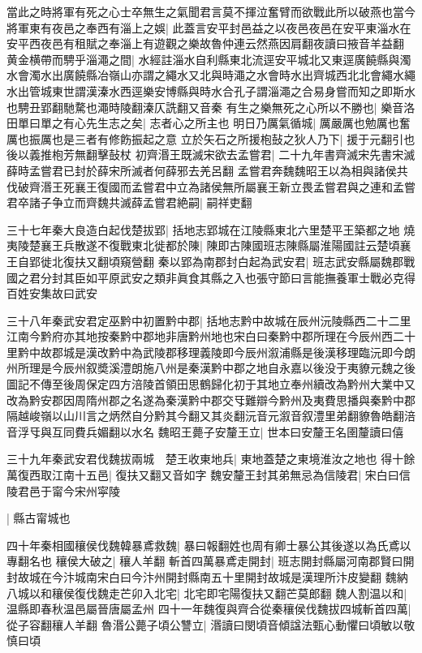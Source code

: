 當此之時將軍有死之心士卒無生之氣聞君言莫不揮泣奮臂而欲戰此所以破燕也當今將軍東有夜邑之奉西有淄上之娛|{
	此蓋言安平封邑益之以夜邑夜邑在安平東淄水在安平西夜邑有租賦之奉淄上有遊觀之樂故魯仲連云然燕因肩翻夜讀曰掖音羊益翻}
黄金横帶而騁乎淄澠之間|{
	水經註淄水自利縣東北流逕安平城北又東逕廣饒縣與濁水會濁水出廣饒縣冶嶺山亦謂之繩水又北與時澠之水會時水出齊城西北北會繩水繩水出管城東世謂漢溱水西逕樂安博縣與時水合孔子謂淄澠之合易身嘗而知之即斯水也騁丑郢翻馳騖也澠時陵翻溱仄詵翻又音秦}
有生之樂無死之心所以不勝也|{
	樂音洛}
田單曰單之有心先生志之矣|{
	志者心之所主也}
明日乃厲氣循城|{
	厲嚴厲也勉厲也奮厲也振厲也是三者有修飭振起之意}
立於矢石之所援枹鼔之狄人乃下|{
	援于元翻引也後以義推枹芳無翻擊鼔杖}
初齊湣王既滅宋欲去孟嘗君|{
	二十九年書齊滅宋先書宋滅薛時孟嘗君已封於薛宋所滅者何薛邪去羌呂翻}
孟嘗君奔魏魏昭王以為相與諸侯共伐破齊湣王死襄王復國而孟嘗君中立為諸侯無所屬襄王新立畏孟嘗君與之連和孟嘗君卒諸子争立而齊魏共滅薛孟嘗君絶嗣|{
	嗣祥吏翻}


三十七年秦大良造白起伐楚拔郢|{
	括地志郢城在江陵縣東北六里楚平王築都之地}
燒夷陵楚襄王兵散遂不復戰東北徙都於陳|{
	陳即古陳國班志陳縣屬淮陽國註云楚頃襄王自郢徙北復扶又翻頃窺營翻}
秦以郢為南郡封白起為武安君|{
	班志武安縣屬魏郡戰國之君分封其臣如平原武安之類非眞食其縣之入也張守節曰言能撫養軍士戰必克得百姓安集故曰武安}


三十八年秦武安君定巫黔中初置黔中郡|{
	括地志黔中故城在辰州沅陵縣西二十二里江南今黔府亦其地按秦黔中郡地非唐黔州地也宋白曰秦黔中郡所理在今辰州西二十里黔中故郡城是漢改黔中為武陵郡移理義陵即今辰州溆浦縣是後漢移理臨沅即今朗州所理是今辰州叙奬溪澧朗施八州是秦漢黔中郡之地自永嘉以後没于夷䝤元魏之後圖記不傳至後周保定四方涪陵首領田思鶴歸化初于其地立奉州續改為黔州大業中又改為黔安郡因周隋州郡之名遂為秦漢黔中郡交㸦難辯今黔州及夷費思播與秦黔中郡隔越峻嶺以山川言之炳然自分黔其今翻又其炎翻沅音元溆音叙澧里弟翻䝤魯皓翻涪音浮㸦與互同費兵媚翻以水名}
魏昭王薨子安釐王立|{
	世本曰安釐王名圉釐讀曰僖}


三十九年秦武安君伐魏拔兩城　楚王收東地兵|{
	東地蓋楚之東境淮汝之地也}
得十餘萬復西取江南十五邑|{
	復扶又翻又音如字}
魏安釐王封其弟無忌為信陵君|{
	宋白曰信陵君邑于甯今宋州寜陵}


|{
	縣古甯城也}


四十年秦相國穰侯伐魏韓暴鳶救魏|{
	暴曰報翻姓也周有卿士暴公其後遂以為氏鳶以專翻名也}
穰侯大破之|{
	穰人羊翻}
斬首四萬暴鳶走開封|{
	班志開封縣屬河南郡賢曰開封故城在今汴城南宋白曰今汴州開封縣南五十里開封故城是漢理所汴皮變翻}
魏納八城以和穰侯復伐魏走芒卯入北宅|{
	北宅即宅陽復扶又翻芒莫郎翻}
魏人割温以和|{
	温縣即春秋温邑屬晉唐屬孟州}
四十一年魏復與齊合從秦穰侯伐魏拔四城斬首四萬|{
	從子容翻穰人羊翻}
魯湣公薨子頃公讐立|{
	湣讀曰閔頃音傾諡法甄心動懼曰頃敏以敬慎曰頃}


